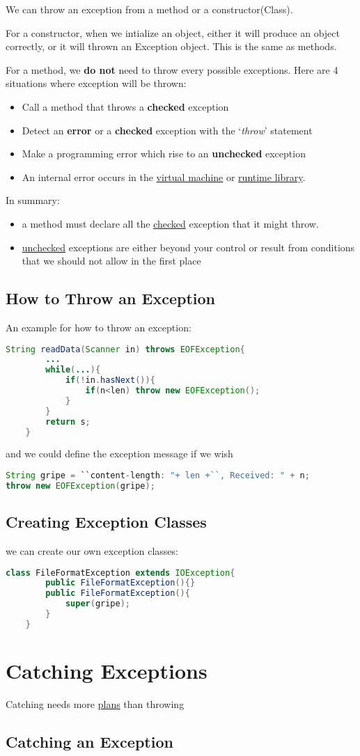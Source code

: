 \documentclass[12pt]{article}
\begin{document}
We can throw an exception from a method or a constructor(Class). 

For a constructor, when we intialize an object, either it will produce an object correctly, 
or it will thrown an Exception object. This is the same as methods.

For a method, we \textbf{do not} need to throw every possible exceptions. Here are 4 situations where exception
will be thrown:
\begin{itemize}
    \item Call a method that throws a \textbf{checked} exception
    \item Detect an \textbf{error} or a \textbf{checked} exception with the `\textit{throw}' statement
    \item Make a programming error which rise to an \textbf{unchecked} exception
    \item An internal error occurs in the \underline{virtual machine} or \underline{runtime library}.
\end{itemize}

In summary:
\begin{itemize}
    \item a method must declare all the \underline{checked} exception that it might throw.
    \item \underline{unchecked} exceptions are either beyond your control or result from conditions that
    we should not allow in the first place 
\end{itemize}

\subsection{How to Throw an Exception}
An example for how to throw an exception:
\begin{lstlisting}[language=Java]
    String readData(Scanner in) throws EOFException{
        ...
        while(...){
            if(!in.hasNext()){
                if(n<len) throw new EOFException();
            }
        }
        return s;
    }
\end{lstlisting}

and we could define the exception message if we wish
\begin{lstlisting}[language=Java]
String gripe = ``content-length: "+ len +``, Received: " + n;
throw new EOFException(gripe);
\end{lstlisting}

\subsection{Creating Exception Classes}
we can create our own exception classes:
\begin{lstlisting}[language=Java]
    class FileFormatException extends IOException{
        public FileFormatException(){}
        public FileFormatException(){
            super(gripe);
        }
    }
\end{lstlisting}

\section{Catching Exceptions}
Catching needs more \underline{plans} than throwing
\subsection{Catching an Exception}
\end{document}
